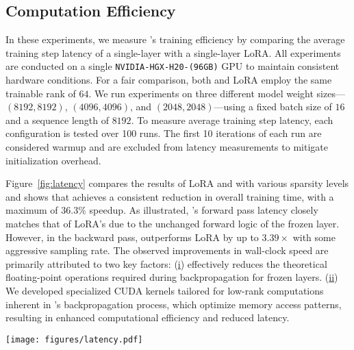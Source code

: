 \subsection{Computation Efficiency}

In these experiments, we measure \celora's training efficiency by comparing the average training step latency of a single-layer \celora with a single-layer LoRA. 
% 
All experiments are conducted on a single \texttt{NVIDIA-HGX-H20-(96GB)} GPU to maintain consistent hardware conditions. 
% 
For a fair comparison, both \celora and LoRA employ the same trainable rank of $64$. 
% 
We run experiments on three different model weight sizes---$(8192, 8192)$, $(4096, 4096)$, and $(2048, 2048)$---using a fixed batch size of $16$ and a sequence length of $8192$. 
% 
To measure average training step latency, each configuration is tested over 100 runs.%
% 
The first 10 iterations of each run are considered warmup and are excluded from latency measurements to mitigate initialization overhead.



Figure~\ref{fig:latency} compares the results of LoRA and \celora with various sparsity levels and shows that \celora achieves a consistent reduction in overall training time, with a maximum of $36.3\%$ speedup. 
% 
As illustrated, \celora’s forward pass latency closely matches that of LoRA's due to the unchanged forward logic of the frozen layer. 
% 
However, in the backward pass, \celora outperforms LoRA by up to $3.39\times$ with some aggressive sampling rate.
% 
The observed improvements in wall-clock speed are primarily attributed to two key factors:
% 
(\underline{i}) \celora effectively reduces the theoretical floating-point operations required during backpropagation for frozen layers. 
(\underline{ii}) We developed specialized CUDA kernels tailored for low-rank computations inherent in \celora's backpropagation process, which optimize memory access patterns, resulting in enhanced computational efficiency and reduced latency.

\begin{figure*}[!t]
  \centering
    \texttt{[image: figures/latency.pdf]}
  \vspace{-5mm}
  \caption{Comparison of training latency for \celora and LoRA at various sparsity levels (i.e., $\frac{1}{2}$, $\frac{1}{4}$, $\frac{1}{8}$, $\frac{1}{16}$) across three model shapes: $(8192, 8192)$, $(4096, 4096)$, and $(2048, 2048)$. \celora provides significant speedups in the backward pass, leading to a maximum of $36.3\%$ overall reduction in end-to-end training time compared to LoRA.}
  \label{fig:latency}
\end{figure*}